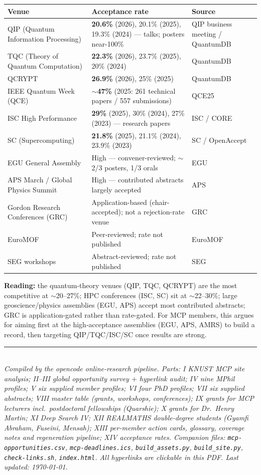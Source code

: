 \documentclass[11pt,a4paper]{article}
\begin{document}
\begin{longtable}{@{}L{5.2cm}L{6.4cm}L{3.8cm}@{}}
\toprule
\textbf{Venue} & \textbf{Acceptance rate} & \textbf{Source} \\
\midrule
\endhead
QIP (Quantum Information Processing) & \textbf{20.6\%} (2026), 20.1\% (2025), 19.3\% (2024) --- talks; posters near-100\% & QIP business meeting / QuantumDB \\
\midrule
TQC (Theory of Quantum Computation) & \textbf{22.3\%} (2026), 23.7\% (2025), 20\% (2024) & QuantumDB \\
\midrule
QCRYPT & \textbf{26.9\%} (2026), 25\% (2025) & QuantumDB \\
\midrule
IEEE Quantum Week (QCE) & \textbf{$\sim$47\%} (2025: 261 technical papers / 557 submissions) & QCE25 \\
\midrule
ISC High Performance & \textbf{29\%} (2025), 30\% (2024), 27\% (2023) --- research papers & ISC / CORE \\
\midrule
SC (Supercomputing) & \textbf{21.8\%} (2025), 21.1\% (2024), 23.9\% (2023) & SC / OpenAccept \\
\midrule
EGU General Assembly & High --- convener-reviewed; $\sim$2/3 posters, 1/3 orals & EGU \\
\midrule
APS March / Global Physics Summit & High --- contributed abstracts largely accepted & APS \\
\midrule
Gordon Research Conferences (GRC) & Application-based (chair-accepted); not a rejection-rate venue & GRC \\
\midrule
EuroMOF & Peer-reviewed; rate not published & EuroMOF \\
\midrule
SEG workshops & Abstract-reviewed; rate not published & SEG \\
\bottomrule
\end{longtable}

\noindent\textbf{Reading:} the quantum-theory venues (QIP, TQC, QCRYPT) are the most competitive at $\sim$20--27\%; HPC conferences (ISC, SC) sit at $\sim$22--30\%; large geoscience/physics assemblies (EGU, APS) accept most contributed abstracts; GRC is application-gated rather than rate-gated. For MCP members, this argues for aiming first at the high-acceptance assemblies (EGU, APS, AMRS) to build a record, then targeting QIP/TQC/ISC/SC once results are strong.

\bigskip
\noindent\rule{\textwidth}{0.4pt}\\
\small\emph{Compiled by the opencode online-research pipeline. Parts: I KNUST MCP site analysis; II--III global opportunity survey $+$ hyperlink audit; IV nine MPhil profiles; V six supplied member profiles; VI four PhD profiles; VII six supplied abstracts; VIII master table (grants, workshops, conferences); IX grants for MCP lecturers incl.\ postdoctoral fellowships (Quarshie); X grants for Dr.\ Henry Martin; XI Deep Search IV; XII REALMATHS double-degree students (Gyamfi Abraham, Fuseini, Mensah); XIII per-member action cards, glossary, coverage notes and regeneration pipeline; XIV acceptance rates. Companion files: \texttt{mcp-opportunities.csv}, \texttt{mcp-deadlines.ics}, \texttt{build\_assets.py}, \texttt{build\_site.py}, \texttt{check-links.sh}, \texttt{index.html}. All hyperlinks are clickable in this PDF. Last updated: \today.}
\end{document}
